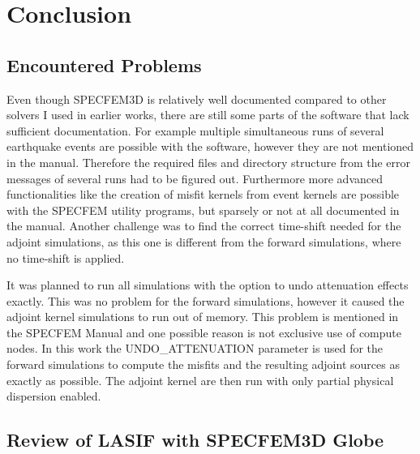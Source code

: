 

\chapter{Conclusion}


\section{Encountered Problems}

Even though SPECFEM3D is relatively well documented compared to other solvers I used in 
earlier works, there are still some parts of the software that lack sufficient documentation.
For example multiple simultaneous runs of several earthquake events are possible with the 
software, however they are not mentioned in the manual.
Therefore the required files and directory structure from the error messages of
several runs had to be figured out. 
Furthermore more advanced functionalities like the creation of misfit kernels from event kernels are
possible with the SPECFEM utility programs, but sparsely or not at all documented in the manual.
Another challenge was to find the correct time-shift needed for the adjoint simulations, as this 
one is different from the forward simulations, where no time-shift is applied.

It was planned to run all simulations with the option to undo attenuation effects exactly. 
This was no problem for the forward simulations, however it caused the adjoint kernel
simulations to run out of memory.
This problem is mentioned in the SPECFEM Manual and one possible reason is not exclusive use
of compute nodes. 
In this work the UNDO\_ATTENUATION parameter is used for the forward simulations to compute the 
misfits and the resulting adjoint sources as exactly as possible.
The adjoint kernel are then run with only partial physical dispersion enabled.

\section{Review of LASIF with SPECFEM3D Globe} 

